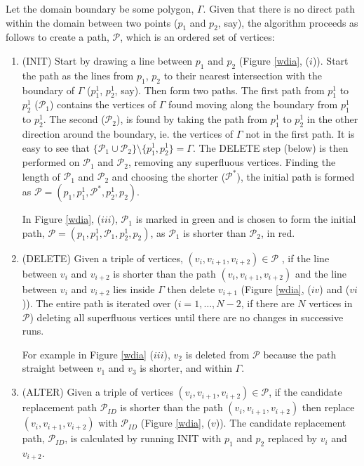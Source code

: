 \documentclass[useAMS, referee]{biom}
\begin{document}
Let the domain boundary be some polygon, $\Gamma$. Given that there is no direct path within the domain between two points ($p_1$ and $p_2$, say), the algorithm proceeds as follows to create a path, $\mathcal{P}$, which is an ordered set of vertices:
\begin{enumerate}
\item (INIT) Start by drawing a line between $p_1$ and $p_2$ (Figure \ref{wdia}, ($i$)). Start the path as the lines from $p_1$, $p_2$ to their nearest intersection with the boundary of $\Gamma$ ($p_1^1$, $p_2^1$, say). Then form two paths. The first path from $p_1^1$ to $p_2^1$ ($\mathcal{P}_1$) contains the vertices of $\Gamma$ found moving along the boundary from $p_1^1$ to $p_2^1$. The second ($\mathcal{P}_2$), is found by taking the path from $p_1^1$ to $p_2^1$ in the other direction around the boundary, ie. the vertices of $\Gamma$ not in the first path. It is easy to see that $\{\mathcal{P}_1 \cup \mathcal{P}_2\} \setminus \{p_1^1, p_2^1\} = \Gamma$. The DELETE step (below) is then performed on $\mathcal{P}_1$ and $\mathcal{P}_2$, removing any superfluous vertices. Finding the length of $\mathcal{P}_1$ and $\mathcal{P}_2$ and choosing the shorter ($\mathcal{P^*}$), the initial path is formed as $\mathcal{P}=(p_1,p_1^1,\mathcal{P}^*,p_2^1,p_2)$. 

In Figure \ref{wdia}, ($iii$), $\mathcal{P}_1$ is marked in green and is chosen to form the initial path, $\mathcal{P}=(p_1,p_1^1,\mathcal{P}_1,p_2^1,p_2)$, as $\mathcal{P}_1$ is shorter than $\mathcal{P}_2$, in red.

\item (DELETE) Given a triple of vertices, $(v_i, v_{i+1}, v_{i+2}) \in \mathcal{P}$ , if the line between $v_i$ and $v_{i+2}$ is shorter than the path $(v_i, v_{i+1}, v_{i+2})$ and the line between $v_i$ and $v_{i+2}$ lies inside $\Gamma$ then delete $v_{i+1}$ (Figure \ref{wdia}, ($iv$) and ($vi$)). The entire path is iterated over ($i=1,\ldots,N-2$, if there are $N$ vertices in $\mathcal{P}$)  deleting all superfluous vertices until there are no changes in successive runs. 

For example in Figure \ref{wdia} ($iii$), $v_2$ is deleted from $\mathcal{P}$ because the path straight between $v_1$ and $v_3$ is shorter, and within $\Gamma$.

\item (ALTER) Given a triple of vertices $(v_i, v_{i+1}, v_{i+2}) \in \mathcal{P}$, if the candidate replacement path $\mathcal{P}_{ID}$ is shorter than the path $(v_i, v_{i+1}, v_{i+2})$ then replace $(v_i, v_{i+1}, v_{i+2})$ with $\mathcal{P}_{ID}$ (Figure \ref{wdia}, ($v$)). The candidate replacement path, $\mathcal{P}_{ID}$, is calculated by running INIT with $p_1$ and $p_2$ replaced by $v_i$ and $v_{i+2}$.


\end{enumerate}
\end{document}
